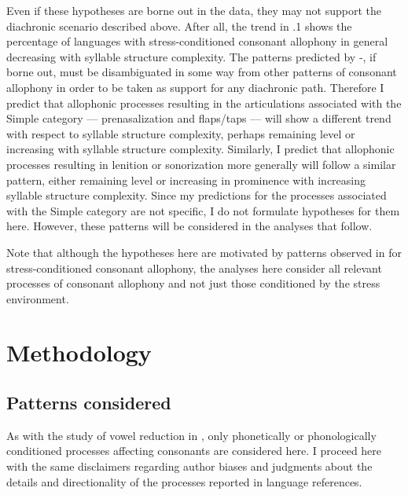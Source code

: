   Even if these hypotheses are borne out in the data, they may not support the diachronic scenario described above. After all, the trend in .1 shows the percentage of languages with stress-conditioned consonant allophony in general decreasing with syllable structure complexity. The patterns predicted by -, if borne out, must be disambiguated in some way from other patterns of consonant allophony in order to be taken as support for any diachronic path. Therefore I predict that allophonic processes resulting in the articulations associated with the Simple category — prenasalization and flaps/taps — will show a different trend with respect to syllable structure complexity, perhaps remaining level or increasing with syllable structure complexity. Similarly, I predict that allophonic processes resulting in lenition or sonorization more generally will follow a similar pattern, either remaining level or increasing in prominence with increasing syllable structure complexity. Since my predictions for the processes associated with the Simple category are not specific, I do not formulate hypotheses for them here. However, these patterns will be considered in the analyses that follow.

  Note that although the hypotheses here are motivated by patterns observed in  for stress-conditioned consonant allophony, the analyses here consider all relevant processes of consonant allophony and not just those conditioned by the stress environment.

\section{Methodology}\label{sec:7.2}
\subsection{Patterns considered}\label{sec:7.2.1}

  As with the study of vowel reduction in , only phonetically or phonologically conditioned processes affecting consonants are considered here. I proceed here with the same disclaimers regarding author biases and judgments about the details and directionality of the processes reported in language references.

